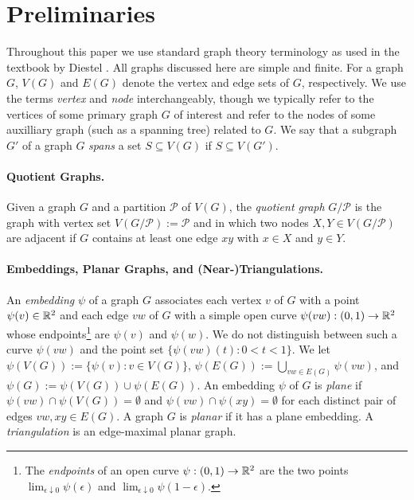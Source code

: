 \documentclass{patmorin}
\begin{document}
\section{Preliminaries}
\label{prelims}

Throughout this paper we use standard graph theory terminology as used in the textbook by Diestel \cite{diestel:graph}.  All graphs discussed here are simple and finite.  For a graph $G$, $V(G)$ and $E(G)$ denote the vertex and edge sets of $G$, respectively.  We use the terms \emph{vertex} and \emph{node} interchangeably, though we typically refer to the vertices of some primary graph $G$ of interest and refer to the nodes of some auxilliary graph (such as a spanning tree) related to $G$.  We say that a subgraph $G'$ of a graph $G$ \emph{spans} a set $S\subseteq V(G)$ if $S\subseteq V(G')$.


\paragraph{Quotient Graphs.}

Given a graph $G$ and a partition $\mathcal{P}$ of $V(G)$, the \emph{quotient graph} $G/\mathcal{P}$ is the graph with vertex set $V(G/\mathcal{P}):=\mathcal{P}$ and in which two nodes $X,Y\in V(G/\mathcal{P})$ are adjacent if $G$ contains at least one edge $xy$ with $x\in X$ and $y\in Y$.

\paragraph{Embeddings, Planar Graphs, and (Near-)Triangulations.}

An \emph{embedding} $\psi$ of a graph $G$ associates each vertex $v$ of $G$ with a point $\psi(v)\in \mathbb{R}^2$ and each edge $vw$ of $G$ with a simple open curve $\psi(vw):(0,1)\to\mathbb{R}^2$ whose endpoints\footnote{The \emph{endpoints} of an open curve $\psi:(0,1)\to\mathbb{R}^2$ are the two points $\lim_{\epsilon\downarrow 0} \psi(\epsilon)$ and $\lim_{\epsilon\downarrow 0}\psi(1-\epsilon)$.} are $\psi(v)$ and $\psi(w)$.  We do not distinguish between such a curve $\psi(vw)$ and the point set $\{\psi(vw)(t):0<t<1\}$.
We let $\psi(V(G)):=\{\psi(v):v\in V(G)\}$, $\psi(E(G)):=\bigcup_{vw\in E(G)} \psi(vw)$, and $\psi(G):=\psi(V(G))\cup\psi(E(G))$.  An embedding $\psi$ of $G$ is \emph{plane} if $\psi(vw)\cap\psi(V(G))=\emptyset$ and $\psi(vw)\cap\psi(xy)=\emptyset$ for each distinct pair of edges $vw,xy\in E(G)$.  A graph $G$ is \emph{planar} if it has a plane embedding. A \emph{triangulation} is an edge-maximal planar graph.
\end{document}
